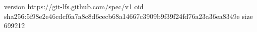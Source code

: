 version https://git-lfs.github.com/spec/v1
oid sha256:5f98e2e46cdcf6a7a8c8d6cecb68a14667c3909b9f39f24fd76a23a36ea8349e
size 699212
